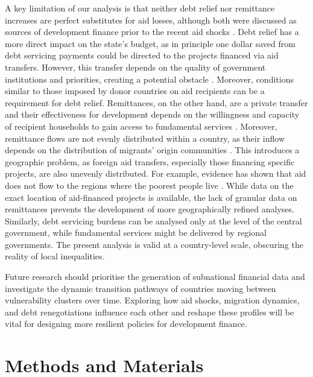 \documentclass[fleqn,10pt,twocolumn]{wlscirep}
\begin{document}
{A key limitation of our analysis is that neither debt relief nor remittance increases are perfect substitutes for aid losses, although both were discussed as sources of development finance prior to the recent aid shocks \cite{ratha2005workers, hanlon2000much}. Debt relief has a more direct impact on the state's budget, as in principle one dollar saved from debt servicing payments could be directed to the projects financed via aid transfers. However, this transfer depends on the quality of government institutions and priorities, creating a potential obstacle \cite{moss2006aid}. Moreover, conditions similar to those imposed by donor countries on aid recipients can be a requirement for debt relief. Remittances, on the other hand, are a private transfer and their effectiveness for development depends on the willingness and capacity of recipient households to gain access to fundamental services \cite{carling2020remittances}. Moreover, remittance flows are not evenly distributed within a country, as their inflow depends on the distribution of migrants' origin communities \cite{taylor1992remittances}. This introduces a geographic problem, as foreign aid transfers, especially those financing specific projects, are also unevenly distributed. For example, evidence has shown that aid does not flow to the regions where the poorest people live \cite{briggs2017does}. While data on the exact location of aid-financed projects is available, the lack of granular data on remittances prevents the development of more geographically refined analyses. Similarly, debt servicing burdens can be analysed only at the level of the central government, while fundamental services might be delivered by regional governments. The present analysis is valid at a country-level scale, obscuring the reality of local inequalities.}

{Future research should prioritise the generation of subnational financial data and investigate the dynamic transition pathways of countries moving between vulnerability clusters over time. Exploring how aid shocks, migration dynamics, and debt renegotiations influence each other and reshape these profiles will be vital for designing more resilient policies for development finance.}

\section*{Methods and Materials}
\label{sec:methods}
\end{document}
